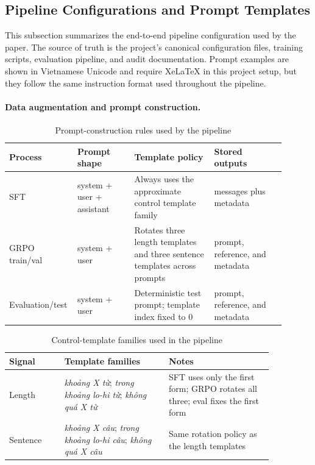 \documentclass[11pt]{article}
\newcommand{\vn}[1]{{\vietfont #1}}
\begin{document}
\subsection{Pipeline Configurations and Prompt Templates}
\label{sec:appendix-prompts}
This subsection summarizes the end-to-end pipeline configuration used by the paper.
The source of truth is the project's canonical configuration files, training scripts, evaluation pipeline, and audit documentation.
Prompt examples are shown in Vietnamese Unicode and require XeLaTeX in this project setup, but they follow the same instruction format used throughout the pipeline.

\paragraph{Data augmentation and prompt construction.}
\begin{table}[H]
\centering
\caption{Prompt-construction rules used by the pipeline}
\label{tab:appendix-prompt-rules}
\small
\begin{tabular}{L{0.17\linewidth}L{0.20\linewidth}L{0.28\linewidth}L{0.25\linewidth}}
\toprule
Process & Prompt shape & Template policy & Stored outputs \\
\midrule
SFT & system + user + assistant & Always uses the approximate control template family & messages plus metadata \\
GRPO train/val & system + user & Rotates three length templates and three sentence templates across prompts & prompt, reference, and metadata \\
Evaluation/test & system + user & Deterministic test prompt; template index fixed to 0 & prompt, reference, and metadata \\
\bottomrule
\end{tabular}
\end{table}

\begin{table}[H]
\centering
\caption{Control-template families used in the pipeline}
\label{tab:appendix-template-families}
\small
\begin{tabular}{L{0.18\linewidth}L{0.34\linewidth}L{0.34\linewidth}}
\toprule
Signal & Template families & Notes \\
\midrule
Length & \textit{\vn{khoảng X từ}}; \textit{\vn{trong khoảng lo-hi từ}}; \textit{\vn{không quá X từ}} & SFT uses only the first form; GRPO rotates all three; eval fixes the first form \\
Sentence & \textit{\vn{khoảng X câu}}; \textit{\vn{trong khoảng lo-hi câu}}; \textit{\vn{không quá X câu}} & Same rotation policy as the length templates \\
\bottomrule
\end{tabular}
\end{table}
\end{document}
